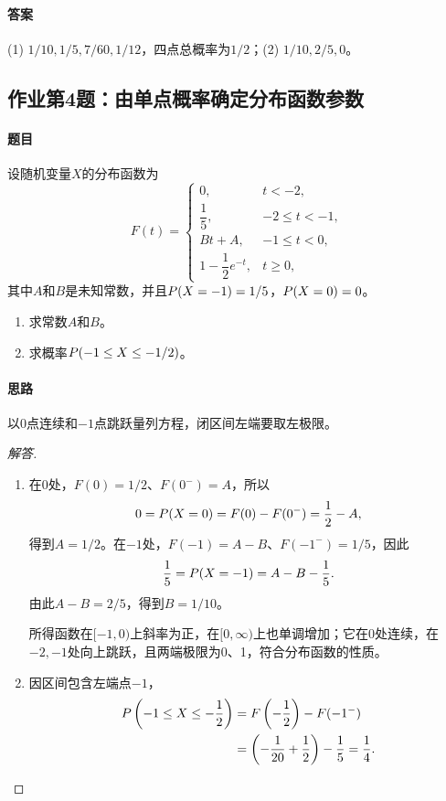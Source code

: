 \paragraph{答案}(1) $1/10,1/5,7/60,1/12$，四点总概率为$1/2$；(2) $1/10,2/5,0$。

\subsection{作业第4题：由单点概率确定分布函数参数}
\label{ex:w06-h4}
\paragraph{题目}
设随机变量$X$的分布函数为
\[
F(t)=\begin{cases}
0,&t<-2,\\
\dfrac15,&-2\leq t<-1,\\
Bt+A,&-1\leq t<0,\\
1-\dfrac12e^{-t},&t\geq0,
\end{cases}
\]
其中$A$和$B$是未知常数，并且$\P(X=-1)=1/5$，$\P(X=0)=0$。
\begin{enumerate}
\item 求常数$A$和$B$。
\item 求概率$\P(-1\leq X\leq-1/2)$。
\end{enumerate}
\paragraph{思路}以0点连续和$-1$点跳跃量列方程，闭区间左端要取左极限。
\begin{proof}[解答]
\begin{enumerate}
\item 在0处，$F(0)=1/2$、$F(0^-)=A$，所以
\[
0=\P(X=0)=F(0)-F(0^-)=\frac12-A,
\]
得到$A=1/2$。在$-1$处，$F(-1)=A-B$、$F(-1^-)=1/5$，因此
\[
\frac15=\P(X=-1)=A-B-\frac15.
\]
由此$A-B=2/5$，得到$B=1/10$。

所得函数在$[-1,0)$上斜率为正，在$[0,\infty)$上也单调增加；它在0处连续，在$-2,-1$处向上跳跃，且两端极限为0、1，符合分布函数的性质。
\item 因区间包含左端点$-1$，
\begin{align*}
\P\left(-1\leq X\leq-\frac12\right)
&=F\left(-\frac12\right)-F(-1^-)\\
&=\left(-\frac1{20}+\frac12\right)-\frac15=\frac14.
\end{align*}
\end{enumerate}
\end{proof}
